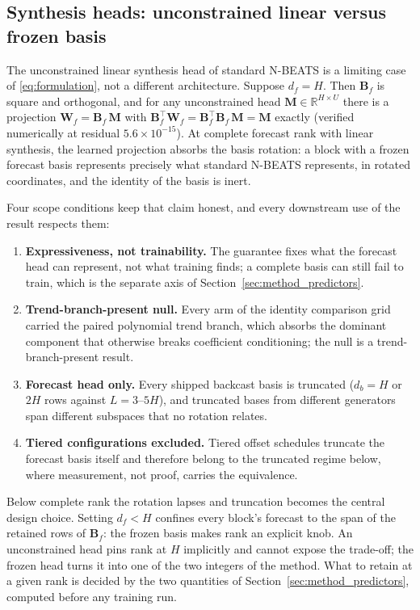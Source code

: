 \subsection{Synthesis heads: unconstrained linear versus frozen basis}
\label{sec:method_heads}

The unconstrained linear synthesis head of standard N-BEATS is a limiting
case of \eqref{eq:formulation}, not a different architecture. Suppose
$d_f = H$. Then $\mathbf{B}_f$ is square and orthogonal, and for any
unconstrained head $\mathbf{M} \in \mathbb{R}^{H \times U}$ there is a
projection $\mathbf{W}_f = \mathbf{B}_f\,\mathbf{M}$ with
$\mathbf{B}_f^{\top}\mathbf{W}_f =
\mathbf{B}_f^{\top}\mathbf{B}_f\,\mathbf{M} = \mathbf{M}$ exactly (verified
numerically at residual $5.6\times10^{-15}$). At complete forecast rank with
linear synthesis, the learned projection absorbs the basis rotation: a block
with a frozen forecast basis represents precisely what standard N-BEATS
represents, in rotated coordinates, and the identity of the basis is inert.

Four scope conditions keep that claim honest, and every downstream use of the
result respects them:

\begin{enumerate}
\item \textbf{Expressiveness, not trainability.} The guarantee fixes what the
forecast head can represent, not what training finds; a complete basis can
still fail to train, which is the separate axis of
Section~\ref{sec:method_predictors}.
\item \textbf{Trend-branch-present null.} Every arm of the identity comparison
grid carried the paired polynomial trend branch, which absorbs the dominant
component that otherwise breaks coefficient conditioning; the null is a
trend-branch-present result.
\item \textbf{Forecast head only.} Every shipped backcast basis is truncated
($d_b = H$ or $2H$ rows against $L = 3$--$5H$), and truncated bases from
different generators span different subspaces that no rotation relates.
\item \textbf{Tiered configurations excluded.} Tiered offset schedules
truncate the forecast basis itself and therefore belong to the truncated
regime below, where measurement, not proof, carries the equivalence.
\end{enumerate}

Below complete rank the rotation lapses and truncation becomes the central
design choice. Setting $d_f < H$ confines every block's forecast to the span
of the retained rows of $\mathbf{B}_f$: the frozen basis makes rank an
explicit knob. An unconstrained head pins rank at $H$ implicitly and cannot
expose the trade-off; the frozen head turns it into one of the two integers
of the method. What to retain at a given rank is decided by the two quantities
of Section~\ref{sec:method_predictors}, computed before any training run.

